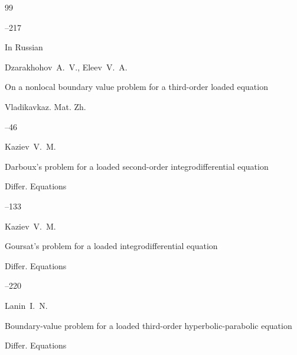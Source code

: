 \begin{thebibliography}{99}

--217 





\lang In Russian

\by Dzarakhohov~A.~V., Eleev~V.~A.

\paper On a nonlocal boundary value problem for a third-order loaded equation

\jour Vladikavkaz. Mat. Zh.




--46









\by Kaziev~V.~M.

\paper Darboux's problem for a loaded second-order integrodifferential equation

\jour Differ. Equations 



--133 





\by Kaziev~V.~M.

\paper Goursat's problem for a loaded integrodifferential equation

\jour Differ. Equations 


--220 











\by Lanin~I.~N.

\paper Boundary-value problem for a loaded third-order hyperbolic-parabolic equation

\jour Differ. Equations 


\end{thebibliography}

